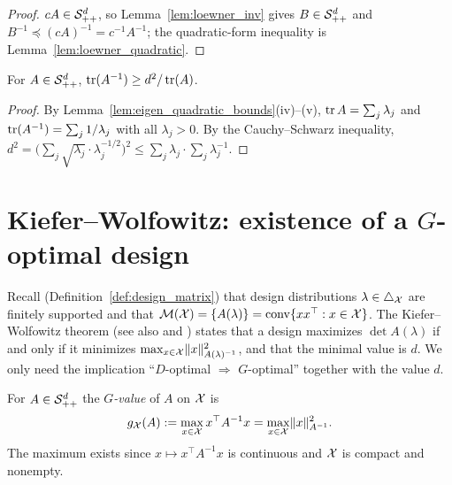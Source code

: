 \begin{proof}
\leanok
{}
$cA \in \mathcal{S}_{++}^{d}$, so Lemma~\ref{lem:loewner_inv} gives $B \in \mathcal{S}_{++}^{d}$ and
$B^{-1} \preceq (cA)^{-1} = c^{-1}A^{-1}$; the quadratic-form inequality is
Lemma~\ref{lem:loewner_quadratic}.
\end{proof}

\begin{lemma}\label{lem:trace_inv_amhm}
\leanok
{}
For $A \in \mathcal{S}_{++}^{d}$, $\operatorname{tr}(A^{-1}) \ge d^2/\operatorname{tr}(A)$.
\end{lemma}

\begin{proof}
\leanok
{}
By Lemma~\ref{lem:eigen_quadratic_bounds}(iv)--(v), $\operatorname{tr} A = \sum_j \lambda_j$ and $\operatorname{tr}(A^{-1}) =
\sum_j 1/\lambda_j$ with all $\lambda_j > 0$. By the Cauchy--Schwarz inequality,
$d^2 = \big(\sum_j \sqrt{\lambda_j}\cdot\lambda_j^{-1/2}\big)^2 \le \sum_j\lambda_j\cdot\sum_j
\lambda_j^{-1}$.
\end{proof}

\section{Kiefer--Wolfowitz: existence of a \texorpdfstring{$G$}{G}-optimal design}
\label{sec:design_kw}

Recall (Definition~\ref{def:design_matrix}) that design distributions $\lambda \in \triangle_{\mathcal{X}}$
are finitely supported and that $\mathcal{M}(\mathcal{X}) = \{A(\lambda)\} = \operatorname{conv}\{xx^\top : x \in \mathcal{X}\}$.
The Kiefer--Wolfowitz theorem \cite{kiefer1960equivalence} (see also
\cite[Chapter~9]{pukelsheim2006optimal} and \cite[Chapter~21]{lattimore2020bandit}) states that
a design maximizes $\det A(\lambda)$ if and only if it minimizes $\max_{x \in \mathcal{X}}
\lVert x \rVert_{A(\lambda)^{-1}}^2$, and that the minimal value is $d$. We only need the implication
``$D$-optimal $\Rightarrow$ $G$-optimal'' together with the value $d$.

\begin{definition}\label{def:g_value}
\leanok
{}
For $A \in \mathcal{S}_{++}^{d}$ the \emph{$G$-value} of $A$ on $\mathcal{X}$ is
\[
  g_{\mathcal{X}}(A) := \max_{x \in \mathcal{X}} x^\top A^{-1} x = \max_{x\in\mathcal{X}}\lVert x \rVert_{A^{-1}}^2 .
\]
The maximum exists since $x \mapsto x^\top A^{-1} x$ is continuous and $\mathcal{X}$ is compact and
nonempty.
\end{definition}

